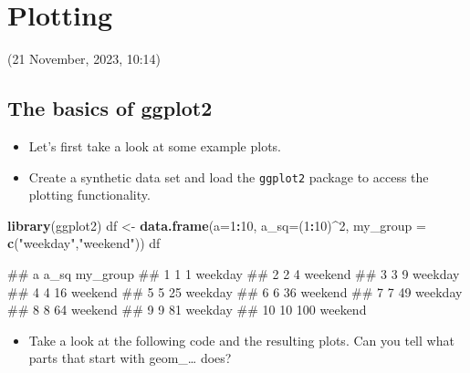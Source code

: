 \documentclass[
]{book}
\newenvironment{Shaded}{\begin{snugshade}}{\end{snugshade}}
\newcommand{\AttributeTok}[1]{\textcolor[rgb]{0.13,0.29,0.53}{#1}}
\newcommand{\DecValTok}[1]{\textcolor[rgb]{0.00,0.00,0.81}{#1}}
\newcommand{\FunctionTok}[1]{\textcolor[rgb]{0.13,0.29,0.53}{\textbf{#1}}}
\newcommand{\NormalTok}[1]{#1}
\newcommand{\OtherTok}[1]{\textcolor[rgb]{0.56,0.35,0.01}{#1}}
\newcommand{\SpecialCharTok}[1]{\textcolor[rgb]{0.81,0.36,0.00}{\textbf{#1}}}
\newcommand{\StringTok}[1]{\textcolor[rgb]{0.31,0.60,0.02}{#1}}
\providecommand{\tightlist}{%
  \setlength{\itemsep}{0pt}\setlength{\parskip}{0pt}}
\begin{document}
\hypertarget{plotting-1}{%
\chapter{Plotting}\label{plotting-1}}

(21 November, 2023, 10:14)

\hypertarget{the-basics-of-ggplot2}{%
\section{The basics of ggplot2}\label{the-basics-of-ggplot2}}

\begin{itemize}
\tightlist
\item
  Let's first take a look at some example plots.
\item
  Create a synthetic data set and load the \texttt{ggplot2} package to access the plotting functionality.
\end{itemize}

\begin{Shaded}
\begin{Highlighting}[]
\FunctionTok{library}\NormalTok{(ggplot2)}
\NormalTok{df }\OtherTok{\textless{}{-}} \FunctionTok{data.frame}\NormalTok{(}\AttributeTok{a=}\DecValTok{1}\SpecialCharTok{:}\DecValTok{10}\NormalTok{, }\AttributeTok{a\_sq=}\NormalTok{(}\DecValTok{1}\SpecialCharTok{:}\DecValTok{10}\NormalTok{)}\SpecialCharTok{\^{}}\DecValTok{2}\NormalTok{, }\AttributeTok{my\_group =} \FunctionTok{c}\NormalTok{(}\StringTok{"weekday"}\NormalTok{,}\StringTok{"weekend"}\NormalTok{))}
\NormalTok{df}
\end{Highlighting}
\end{Shaded}

\begin{Shaded}
\begin{Highlighting}[]
\NormalTok{\#\#     a a\_sq my\_group}
\NormalTok{\#\# 1   1    1  weekday}
\NormalTok{\#\# 2   2    4  weekend}
\NormalTok{\#\# 3   3    9  weekday}
\NormalTok{\#\# 4   4   16  weekend}
\NormalTok{\#\# 5   5   25  weekday}
\NormalTok{\#\# 6   6   36  weekend}
\NormalTok{\#\# 7   7   49  weekday}
\NormalTok{\#\# 8   8   64  weekend}
\NormalTok{\#\# 9   9   81  weekday}
\NormalTok{\#\# 10 10  100  weekend}
\end{Highlighting}
\end{Shaded}

\begin{itemize}
\tightlist
\item
  Take a look at the following code and the resulting plots. Can you tell what parts that start with geom\_\ldots{} does?
\end{itemize}
\end{document}
